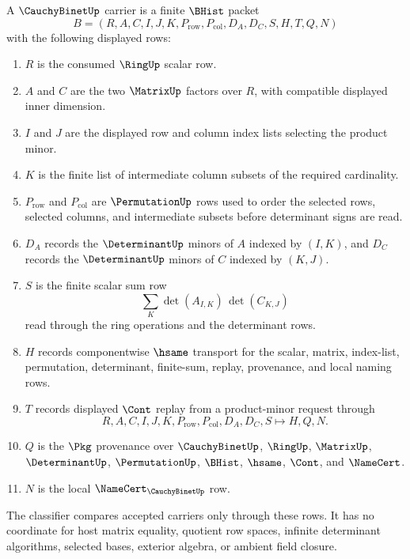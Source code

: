 \begin{definition}\label{def:cauchy-binet-carrier}
A $\CauchyBinetUp$ carrier is a finite $\BHist$ packet
$$
B=(R,A,C,I,J,K,P_{\mathrm{row}},P_{\mathrm{col}},D_A,D_C,S,H,T,Q,N)
$$
with the following displayed rows:
\begin{enumerate}
\item $R$ is the consumed $\RingUp$ scalar row.
\item $A$ and $C$ are the two $\MatrixUp$ factors over $R$, with compatible displayed inner dimension.
\item $I$ and $J$ are the displayed row and column index lists selecting the product minor.
\item $K$ is the finite list of intermediate column subsets of the required cardinality.
\item $P_{\mathrm{row}}$ and $P_{\mathrm{col}}$ are $\PermutationUp$ rows used to order the selected rows, selected columns, and intermediate subsets before determinant signs are read.
\item $D_A$ records the $\DeterminantUp$ minors of $A$ indexed by $(I,K)$, and $D_C$ records the $\DeterminantUp$ minors of $C$ indexed by $(K,J)$.
\item $S$ is the finite scalar sum row
$$
\sum_{K} \det(A_{I,K})\,\det(C_{K,J})
$$
read through the ring operations and the determinant rows.
\item $H$ records componentwise $\hsame$ transport for the scalar, matrix, index-list, permutation, determinant, finite-sum, replay, provenance, and local naming rows.
\item $T$ records displayed $\Cont$ replay from a product-minor request through
$$
R,A,C,I,J,K,P_{\mathrm{row}},P_{\mathrm{col}},D_A,D_C,S \longmapsto H,Q,N .
$$
\item $Q$ is the $\Pkg$ provenance over $\CauchyBinetUp$, $\RingUp$, $\MatrixUp$, $\DeterminantUp$, $\PermutationUp$, $\BHist$, $\hsame$, $\Cont$, and $\NameCert$.
\item $N$ is the local $\NameCert_{\CauchyBinetUp}$ row.
\end{enumerate}
The classifier compares accepted carriers only through these rows. It has no coordinate for host matrix equality, quotient row spaces, infinite determinant algorithms, selected bases, exterior algebra, or ambient field closure.
\end{definition}

